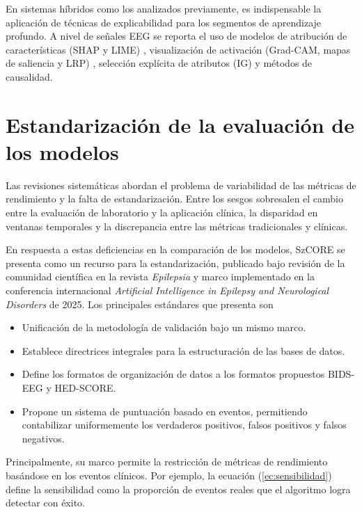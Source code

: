 En sistemas híbridos como los analizados previamente, es indispensable la aplicación de técnicas de explicabilidad para los segmentos de aprendizaje profundo. A nivel de señales EEG se reporta el uso de modelos de atribución de características (SHAP y LIME) \cite{ahmadAdvancedMultimodalLearning2026}, visualización de activación (Grad-CAM, mapas de saliencia y LRP) \cite{ahmadAdvancedMultimodalLearning2026}, selección explícita de atributos (IG) \cite{ahmadAdvancedMultimodalLearning2026} y métodos de causalidad.

\section{Estandarización de la evaluación de los modelos}
Las revisiones sistemáticas \cite{wu_review_2025, slamaComprehensiveReviewMachine2025, afsariArtificialIntelligenceEpileptic2026, craik2019deep} abordan el problema de variabilidad de las métricas de rendimiento y la falta de estandarización. Entre los sesgos sobresalen el cambio entre la evaluación de laboratorio y la aplicación clínica, la disparidad en ventanas temporales y la discrepancia entre las métricas tradicionales y clínicas. 

En respuesta a estas deficiencias en la comparación de los modelos, SzCORE \cite{danSzCOREBenchmarkReport2025} se presenta como un recurso para la estandarización, publicado bajo revisión de la comunidad científica en la revista \textit{Epilepsia} y marco implementado en la conferencia internacional \textit{Artificial Intelligence in Epilepsy and Neurological Disorders} de 2025. Los principales estándares que presenta son
\begin{itemize}
    \item Unificación de la metodología de validación bajo un mismo marco.
    \item Establece directrices integrales para la estructuración de las bases de datos.
    \item Define los formatos de organización de datos a los formatos propuestos BIDS-EEG y HED-SCORE.
    \item Propone un sistema de puntuación basado en eventos, permitiendo contabilizar uniformemente los verdaderos positivos, falsos positivos y falsos negativos.
\end{itemize}

Principalmente, su marco permite la restricción de métricas de rendimiento basándose en los eventos clínicos. Por ejemplo, la ecuación (\ref{ec:sensibilidad}) define la sensibilidad como la proporción de eventos reales que el algoritmo logra detectar con éxito.

